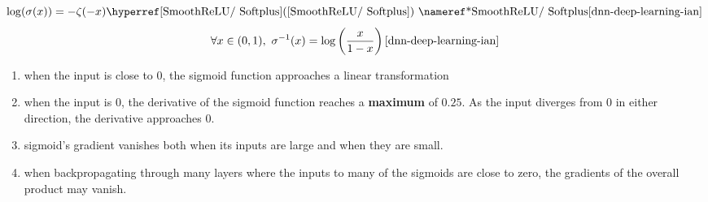 \[
    \log(\sigma(x))
    = -\zeta(-x)
    \hfill \text{\fullref{SmoothReLU/ Softplus}}
    \hfill \text{\cite{dnn-deep-learning-ian}}
\]
\[
    \forall x \in (0,1), \ 
    \sigma^{-1}(x)
    = \log\dParenBrac{\dfrac{x}{1-x}}
    \hfill\text{\cite{dnn-deep-learning-ian}}
\]

\begin{enumerate}
    \item when the input is close to $0$, the sigmoid function approaches a linear transformation

    \item when the input is $0$, the derivative of the sigmoid function reaches a \textbf{maximum} of $0.25$. As the input diverges from $0$ in either direction, the derivative approaches $0$.

    \item sigmoid’s gradient vanishes both when its inputs are large and when they are small. 
    
    \item when backpropagating through many layers where the inputs to many of the sigmoids are close to zero, the gradients of the overall product may vanish.

\end{enumerate}


